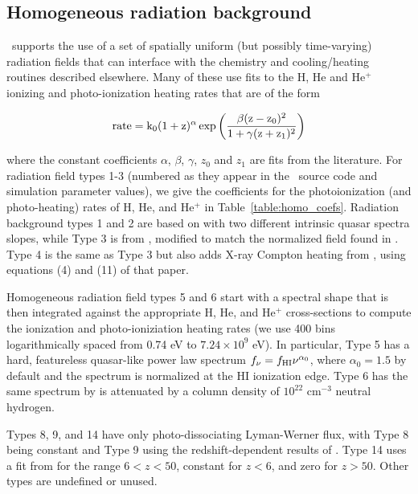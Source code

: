 \subsection{Homogeneous radiation background}
\label{sec.num.rad-homogeneous}

\enzo\ supports the use of a set of spatially uniform (but possibly
time-varying) radiation fields that can interface with the chemistry
and cooling/heating routines described elsewhere.  Many of these use
fits to the H, He and He$^+$ ionizing and photo-ionization heating
rates that are of the form

\begin{equation}
\rm{rate} = k_0  (1+z)^{\alpha}  \exp{\left( \frac{\beta (z-z_0)^2 }{1 + \gamma  (z+z_1)^2} \right)}
\label{eq:homo_rad_template}
\end{equation}

where the constant coefficients $\alpha$, $\beta$, $\gamma$, $z_0$ and
$z_1$ are fits from the literature.  For radiation field types 1-3
(numbered as they appear in the \enzo\ source code and simulation
parameter values), we
give the coefficients for the photoionization (and photo-heating)
rates of H, He, and He$^+$ in Table~\ref{table:homo_coefs}.  Radiation
background types 1
and 2 are based on \citet{1996ApJ...461...20H} with two different
intrinsic quasar spectra slopes, while Type 3 is from
\citet{2012ApJ...746..125H}, modified to match the normalized field
found in \citet{Kirkman05}.  Type 4 is the same as Type 3 but also
adds X-ray Compton heating from \citet{MadauEfstathiou99}, using
equations (4) and (11) of that paper.

Homogeneous radiation field types 5 and 6 start with a spectral shape
that is then integrated against the appropriate H, He, and He$^+$
cross-sections to compute the ionization and photo-ioniziation heating
rates (we use 400 bins logarithmically spaced from 0.74 eV to $7.24
\times 10^9$ eV).  In particular, Type 5 has a hard, featureless
quasar-like power law spectrum $f_{\nu} = f_{\rm HI} \nu^{\alpha_0}$,
where $\alpha_0 = 1.5$ by default and the spectrum is normalized at
the HI ionization edge.  Type 6 has the same spectrum by is attenuated
by a column density of $10^{22}$ cm$^{-3}$ neutral hydrogen.  

Types 8, 9, and 14 have only photo-dissociating Lyman-Werner flux,
with Type 8 being constant and Type 9 using the redshift-dependent
results of \citet{TrentiStiavelli09}.  Type 14 uses a fit from
\citet{WiseAbel05} for the range $6 < z < 50$, constant for $z<6$, and
zero for $z > 50$.  Other types are undefined or unused.


